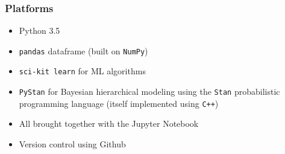 \documentclass{beamer}
\let\olditem=\item
\renewcommand{\item}{\olditem \justifying}
\begin{document}
\frame %
{
  \frametitle{Platforms}
  \begin{itemize}
  \item Python 3.5
  \item \texttt{pandas} dataframe (built on \texttt{NumPy})
  \item \texttt{sci-kit learn} for ML algorithms
  \item \texttt{PyStan} for Bayesian hierarchical modeling using the \newline \texttt{Stan} probabilistic programming language (itself implemented using \texttt{C++})
  \item All brought together with the Jupyter Notebook
  \item Version control using Github
  \end{itemize}
}
\end{document}
